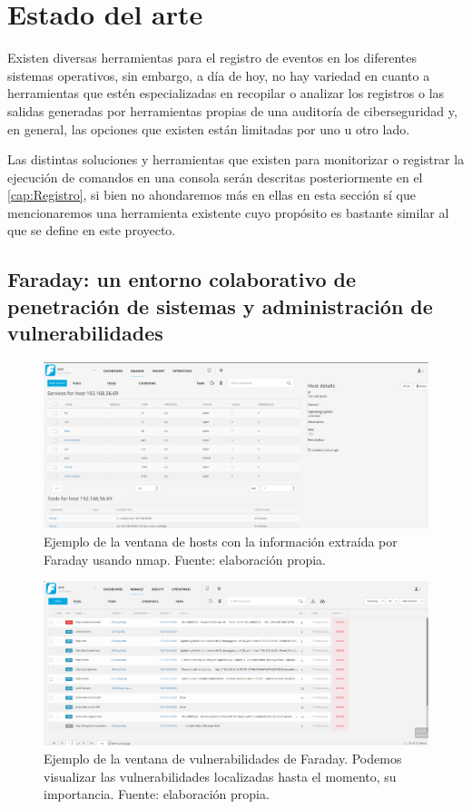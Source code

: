 \section{Estado del arte}\label{sec:estado del arte}

Existen diversas herramientas para el registro de eventos en los diferentes sistemas operativos, sin embargo, a día de hoy, no hay variedad en cuanto a herramientas que estén especializadas en recopilar o analizar los registros o las salidas generadas por herramientas propias de una auditoría de ciberseguridad y, en general, las opciones que existen están limitadas por uno u otro lado.

Las distintas soluciones y herramientas que existen para monitorizar o registrar la ejecución de comandos en una consola serán descritas posteriormente en el \autoref{cap:Registro}, si bien no ahondaremos más en ellas en esta sección sí que mencionaremos una herramienta existente cuyo propósito es bastante similar al que se define en este proyecto.

\subsection{Faraday: un entorno colaborativo de penetración de sistemas y administración de vulnerabilidades}

\begin{figure}[!hbt]
  \centering
  \includegraphics[width=\textwidth]{imagenes/faraday_host.png}
  \caption{Ejemplo de la ventana de hosts con la información extraída por Faraday usando nmap. Fuente: elaboración propia.}
  \label{faraday1}
\end{figure}

\begin{figure}[!hbt]
  \centering
  \includegraphics[width=\textwidth]{imagenes/faraday_vuln.png}
  \caption{Ejemplo de la ventana de vulnerabilidades de Faraday. Podemos visualizar las vulnerabilidades localizadas hasta el momento, su importancia. Fuente: elaboración propia.}
  \label{faraday2}
\end{figure}

